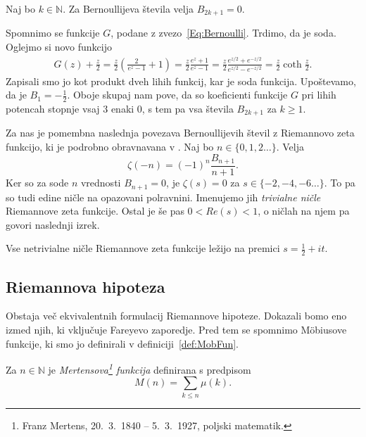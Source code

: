 \documentclass[mat1]{fmfdelo}
\begin{document}
\begin{lema}
Naj bo $k \in \mathbb{N}$. Za Bernoullijeva števila velja $B_{2k+1}=0$.
\end{lema}

\begin{dokaz}
Spomnimo se funkcije $G$, podane z zvezo~\eqref{Eq:Bernoulli}. Trdimo, da je soda. Oglejmo si novo funkcijo
\begin{align}
G(z) + \frac{z}{2} = \frac{z}{2} \left( \frac{2}{e^{z}-1}+1 \right) = \frac{z}{2} \frac{e^{z}+1}{e^{z}-1} 
	= \frac{z}{2} \frac{e^{z/2}+e^{-z/2}}{e^{z/2}-e^{-z/2}} = \frac{z}{2} \coth{\frac{z}{2}}.
\end{align}
%
Zapisali smo jo kot produkt dveh lihih funkcij, kar je soda funkcija. Upoštevamo, da je $B_{1}=-\frac{1}{2}$. Oboje skupaj nam pove, da so koeficienti funkcije $G$ pri lihih potencah stopnje vsaj $3$ enaki $0$, s tem pa vsa števila $B_{2k+1}$ za $k \geq 1$.
\end{dokaz}

Za nas je pomembna naslednja povezava Bernoullijevih števil z Riemannovo zeta funkcijo, ki je podrobno obravnavana v \cite[poglavje 1.5]{zetafunction}. Naj bo $n\in\{0, 1, 2 \dots\}$. Velja
\begin{equation}
	\zeta(-n) = (-1)^n \frac{B_{n+1}}{n+1}.
\end{equation}
Ker so za sode $n$ vrednosti $B_{n+1}=0$, je $\zeta(s)=0$ za $s\in\{-2,-4,-6 \dots\}$. To pa so tudi edine ničle na opazovani polravnini. Imenujemo jih \emph{trivialne ničle} Riemannove zeta funkcije. Ostal je še pas $0<Re(s)<1$, o ničlah na njem pa govori naslednji izrek. 

\begin{izrek}
Vse netrivialne ničle Riemannove zeta funkcije ležijo na premici $s=\frac{1}{2}+it$.
\end{izrek}

\subsection{Riemannova hipoteza}

Obstaja več ekvivalentnih formulacij Riemannove hipoteze. Dokazali bomo eno izmed njih, ki vključuje Fareyevo zaporedje. Pred tem se spomnimo M\"obiusove funkcije, ki smo jo definirali v definiciji~\ref{def:MobFun}.

\begin{definicija}
Za $n\in\mathbb{N}$ je \emph{Mertensova\footnote{Franz Mertens, 20.\ 3.\ 1840 -- 5.\ 3.\ 1927, poljski matematik.} funkcija} definirana s predpisom
\begin{equation}
M(n)=\sum_{k\leq n}\mu(k).
\end{equation}
\end{definicija}
\end{document}
